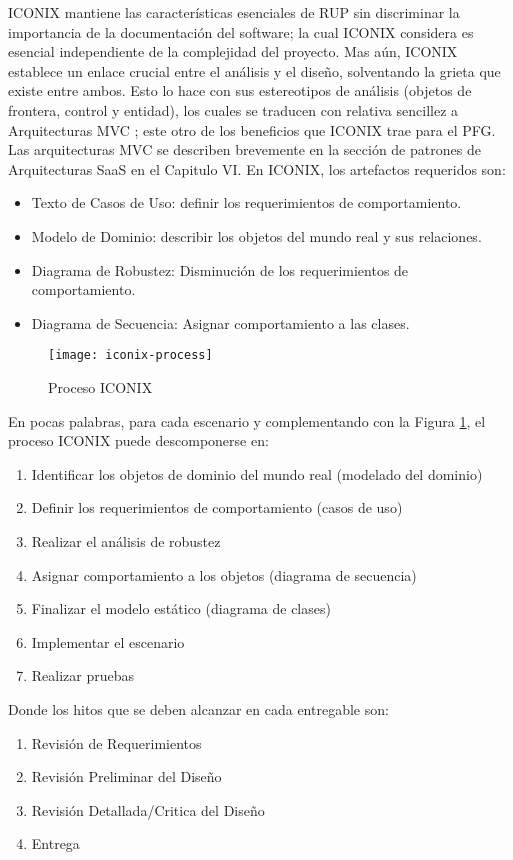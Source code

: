 ICONIX mantiene las características esenciales de RUP sin discriminar la importancia de la documentación del software; la cual ICONIX considera es esencial independiente de la complejidad del proyecto. 
Mas aún, ICONIX establece un enlace crucial entre el análisis y el diseño, solventando la grieta que existe entre ambos. Esto lo hace con sus estereotipos de análisis (objetos de frontera, control y entidad), los cuales se traducen con relativa sencillez a Arquitecturas MVC \cite{Rosen05-ct}; este otro de los beneficios que ICONIX trae para el PFG. Las arquitecturas MVC se describen brevemente en la sección de patrones de Arquitecturas SaaS en el Capitulo VI. 
En ICONIX, los artefactos requeridos son:
\begin{itemize}
  \item Texto de Casos de Uso: definir los requerimientos de comportamiento.
  \item Modelo de Dominio: describir los objetos del mundo real y sus relaciones.
  \item Diagrama de Robustez: Disminución de los requerimientos de comportamiento.
  \item Diagrama de Secuencia: Asignar comportamiento a las clases.
  
\end{itemize}

\begin{figure}[H]
            \centering
            \texttt{[image: iconix-process]}
            \caption{Proceso ICONIX \protect\cite{Rosen05-ct}}
            \label{fig:iconix-process}
        \end{figure}

En pocas palabras, para cada escenario y complementando con la Figura \ref{fig:iconix-process}, el proceso ICONIX puede descomponerse en:
\begin{enumerate}
    \item Identificar los objetos de dominio del mundo real (modelado del dominio)
    \item Definir los requerimientos de comportamiento (casos de uso)
    \item Realizar el análisis de robustez
    \item Asignar comportamiento a los objetos (diagrama de secuencia)
    \item Finalizar el modelo estático (diagrama de clases)
    \item Implementar el escenario
    \item Realizar pruebas
\end{enumerate}

Donde los hitos que se deben alcanzar en cada entregable son:
\begin{enumerate}
    \item Revisión de Requerimientos
    \item Revisión Preliminar del Diseño
    \item Revisión Detallada/Critica del Diseño
    \item Entrega
\end{enumerate}